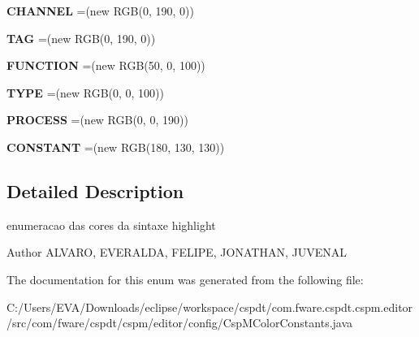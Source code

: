 \begin{DoxyCompactItemize}
{\bfseries C\+H\+A\+N\+N\+EL} =(new R\+GB(0, 190, 0))
\item 
\mbox{\label{enumcom_1_1fware_1_1cspdt_1_1cspm_1_1editor_1_1config_1_1_csp_m_color_constants_a2b0e8544a86ffcc18b476459a9361b5c}} 
{\bfseries T\+AG} =(new R\+GB(0, 190, 0))
\item 
\mbox{\label{enumcom_1_1fware_1_1cspdt_1_1cspm_1_1editor_1_1config_1_1_csp_m_color_constants_a130bad0a23eecfeebfafd8751d8444a7}} 
{\bfseries F\+U\+N\+C\+T\+I\+ON} =(new R\+GB(50, 0, 100))
\item 
\mbox{\label{enumcom_1_1fware_1_1cspdt_1_1cspm_1_1editor_1_1config_1_1_csp_m_color_constants_a53d59a430d14d062e8e14912431647ba}} 
{\bfseries T\+Y\+PE} =(new R\+GB(0, 0, 100))
\item 
\mbox{\label{enumcom_1_1fware_1_1cspdt_1_1cspm_1_1editor_1_1config_1_1_csp_m_color_constants_a719627c2d998c5d9fab10e45b507879b}} 
{\bfseries P\+R\+O\+C\+E\+SS} =(new R\+GB(0, 0, 190))
\item 
\mbox{\label{enumcom_1_1fware_1_1cspdt_1_1cspm_1_1editor_1_1config_1_1_csp_m_color_constants_abffd115e0cc3191268d13c153d4dc7e7}} 
{\bfseries C\+O\+N\+S\+T\+A\+NT} =(new R\+GB(180, 130, 130))
\end{DoxyCompactItemize}


\subsection{Detailed Description}
enumeracao das cores da sintaxe highlight 

\begin{DoxyAuthor}{Author}
A\+L\+V\+A\+RO, E\+V\+E\+R\+A\+L\+DA, F\+E\+L\+I\+PE, J\+O\+N\+A\+T\+H\+AN, J\+U\+V\+E\+N\+AL 
\end{DoxyAuthor}


The documentation for this enum was generated from the following file\+:\begin{DoxyCompactItemize}
\item 
C\+:/\+Users/\+E\+V\+A/\+Downloads/eclipse/workspace/cspdt/com.\+fware.\+cspdt.\+cspm.\+editor/src/com/fware/cspdt/cspm/editor/config/Csp\+M\+Color\+Constants.\+java\end{DoxyCompactItemize}
